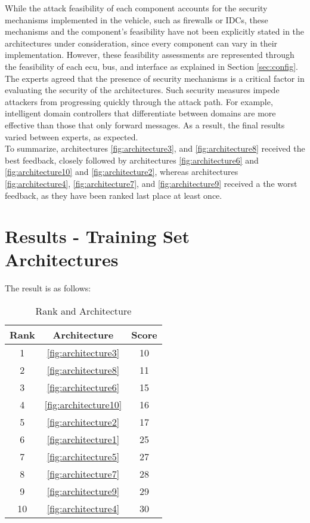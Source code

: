 While the attack feasibility of each component accounts for the security mechanisms implemented in the vehicle, such as firewalls or IDCs, 
these mechanisms and the component's feasibility have not been explicitly stated in the architectures under consideration, since every component can vary in their implementation.
However, these feasibility assessments are represented through the feasibility of each \gls{ecu}, bus, and interface as explained in Section \ref{sec:config}.
The experts agreed that the presence of security mechanisms is a critical factor in evaluating the security of the architectures.
Such security measures impede attackers from progressing quickly through the attack path. 
For example, intelligent domain controllers that differentiate between domains are more effective than those that only forward messages.
As a result, the final results varied between experts, as expected.\\

To summarize, architectures \ref{fig:architecture3}, and \ref{fig:architecture8} received the best feedback, closely followed by architectures \ref{fig:architecture6} and \ref{fig:architecture10} and \ref{fig:architecture2},
whereas architectures \ref{fig:architecture4}, \ref{fig:architecture7}, and \ref{fig:architecture9} received a the worst feedback, as they have been ranked last place at least once.

\section{Results - Training Set Architectures}

The result is as follows:

\begin{table}[h]
    \label{table:survey}
    \centering
    \caption{Rank and Architecture}
    \begin{tabular}{ |c|c|c| } 
    \hline
    Rank & Architecture & Score \\
    \hline
    1 & \ref{fig:architecture3} & 10 \\
    2 & \ref{fig:architecture8} & 11 \\
    3 & \ref{fig:architecture6} & 15 \\
    4 & \ref{fig:architecture10} & 16 \\
    5 & \ref{fig:architecture2} & 17 \\
    6 & \ref{fig:architecture1} & 25 \\
    7 & \ref{fig:architecture5} & 27 \\
    8 & \ref{fig:architecture7} & 28 \\
    9 & \ref{fig:architecture9} & 29 \\
    10 & \ref{fig:architecture4} & 30\\
    \hline
    \end{tabular}
\end{table}
